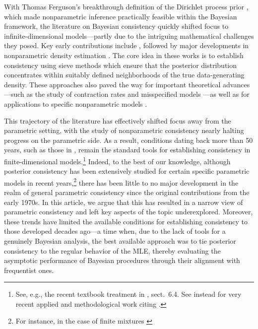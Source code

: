 \documentclass[11pt,twoside]{article}
\begin{document}
With Thomas Ferguson’s breakthrough definition of the Dirichlet process prior \citep{ferguson1973bayesian}, which made nonparametric inference practically feasible within the Bayesian framework, the literature on Bayesian consistency quickly shifted focus to infinite-dimensional models—partly due to the intriguing mathematical challenges they posed. Key early contributions include \cite{diaconis1986consistency, diaconis1986inconsistent}, followed by major developments in nonparametric density estimation \citep{ghosal1999, barron1999, walker2004squarerootsum}. The core idea in these works is to establish consistency using sieve methods which ensure that the posterior distribution concentrates within suitably defined  neighborhoods of the true data-generating density. These approaches also paved the way for important theoretical advances—such as the study of contraction rates \citep{ghosal2000convergencerates, ghosal2007convergence, lijoi2007convergence} and misspecified models \citep{kleijn2006misspecification, deblasi2013bayesian}—as well as for applications to specific nonparametric models \citep{lijoi2005consistency, ghosal2001convergence, ghosal2007posteriorDirichlet, ghosal2006posteriorGP}.

This trajectory of the literature has effectively shifted focus away from the parametric setting, with the study of nonparametric consistency nearly halting progress on the parametric side. As a result, conditions dating back more than 50 years, such as those in \cite{walker1969}, remain the standard tools for establishing consistency in finite-dimensional models.\footnote{See, e.g., the recent textbook treatment in \cite{ghosal2017fundamentals}, sect.~6.4. See instead \cite{mao2024calibrating, rustand2023bayesian, miller2021asymptotic, dougan2021bayesian} for very recent applied and methodological work citing \cite{walker1969}.} Indeed, to the best of our knowledge, although posterior consistency has been extensively studied for certain specific parametric models in recent years,\footnote{For instance, in the case of finite mixtures \citep{rousseau2011asymptotic, guha2021posterior}} there has been little to no major development in the realm of general parametric consistency since the original contributions from the early 1970s. In this article, we argue that this has resulted in a narrow view of parametric consistency and left key aspects of the topic underexplored. Moreover, these trends have limited the available conditions for establishing consistency to those developed decades ago—a time when, due to the lack of tools for a genuinely Bayesian analysis, the best available approach was to tie posterior consistency to the regular behavior of the MLE, thereby evaluating the asymptotic performance of Bayesian procedures through their alignment with frequentist ones.
\end{document}
